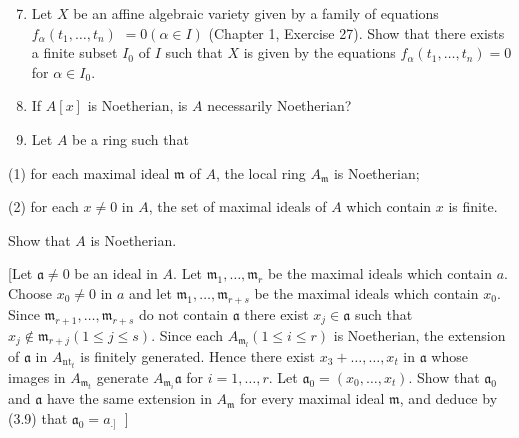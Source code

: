 \documentclass{standalone}
\theoremstyle{definition}
\theoremstyle{remark}
\begin{document}
\begin{enumerate}
  \setcounter{enumi}{6}
  \item Let $X$ be an affine algebraic variety given by a family of equations $f_{\alpha}\left(t_{1}, \ldots, t_{n}\right)$ $=0(\alpha \in I)$ (Chapter 1, Exercise 27). Show that there exists a finite subset $I_{0}$ of $I$ such that $X$ is given by the equations $f_{\alpha}\left(t_{1}, \ldots, t_{n}\right)=0$ for $\alpha \in I_{0}$.

  \item If $A[x]$ is Noetherian, is $A$ necessarily Noetherian?

  \item Let $A$ be a ring such that

\end{enumerate}

(1) for each maximal ideal $\mathfrak{m}$ of $A$, the local ring $A_{\mathfrak{m}}$ is Noetherian;

(2) for each $x \neq 0$ in $A$, the set of maximal ideals of $A$ which contain $x$ is finite.

Show that $A$ is Noetherian.

[Let $\mathfrak{a} \neq 0$ be an ideal in $A$. Let $\mathfrak{m}_{1}, \ldots, \mathfrak{m}_{r}$ be the maximal ideals which contain $a$. Choose $x_{0} \neq 0$ in $a$ and let $\mathfrak{m}_{1}, \ldots, \mathfrak{m}_{r+s}$ be the maximal ideals which contain $x_{0}$. Since $\mathfrak{m}_{r+1}, \ldots, \mathfrak{m}_{r+s}$ do not contain $\mathfrak{a}$ there exist $x_{j} \in \mathfrak{a}$ such that $x_{j} \notin \mathfrak{m}_{r+j}(1 \leqslant j \leqslant s)$. Since each $A_{\mathfrak{m}_{l}}(1 \leqslant i \leqslant r)$ is Noetherian, the extension of $\mathfrak{a}$ in $A_{\mathrm{nt}_{t}}$ is finitely generated. Hence there exist $x_{3}+\ldots, \ldots, x_{t}$ in $\mathfrak{a}$ whose images in $A_{\mathfrak{m}_{t}}$ generate $A_{\mathfrak{m}_{i}} \mathfrak{a}$ for $i=1, \ldots, r$. Let $\mathfrak{a}_{0}=\left(x_{0}, \ldots, x_{t}\right)$. Show that $\mathfrak{a}_{0}$ and $\mathfrak{a}$ have the same extension in $A_{\mathfrak{m}}$ for every maximal ideal $\mathfrak{m}$, and deduce by (3.9) that $\mathfrak{a}_{0}=a_{\text {.] }}$ ]
\end{document}
